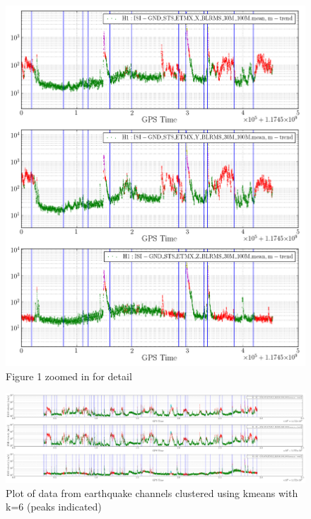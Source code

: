 \documentclass[colorlinks=true,pdfstartview=FitV,linkcolor=blue,
            citecolor=red,urlcolor=magenta]{ligodoc}
\begin{document}
\begin{figure}[htbp]
\begin{center}
\includegraphics[scale = 0.5]{EQdata2_Kmeans_6_crop.png}
\caption{Figure 1 zoomed in for detail}
\label{fig:image2}
\end{center}
\end{figure}

\begin{figure}[htbp]
\begin{center}
\includegraphics[width=1.3\textwidth,angle=90]{EQdata_Kmeans_6_2.png}
\caption{Plot of data from earthquake channels clustered using kmeans with k=6 (peaks indicated)}
\label{fig:image3}
\end{center}
\end{figure}
\end{document}
